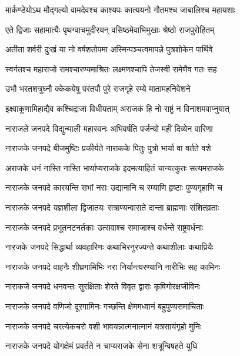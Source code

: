 \twolineshloka
{मार्कण्डेयोऽथ मौद्गल्यो वामदेवश्च काश्यपः}
{कात्ययनो गौतमश्च जाबालिश्च महायशाः} %

\twolineshloka
{एते द्विजाः सहामात्यैः पृथग्वाचमुदीरयन्}
{वसिष्ठमेवाभिमुखाः श्रेष्ठो राजपुरोहितम्} %

\twolineshloka
{अतीता शर्वरी दुःखं या नो वर्षशतोपमा}
{अस्मिन्पञ्चत्वमापन्ने पुत्रशोकेन पार्थिवे} %

\twolineshloka
{स्वर्गतश्च महाराजो रामश्चारण्यमाश्रितः}
{लक्ष्मणश्चापि तेजस्वी रामेणैव गतः सह} %

\twolineshloka
{उभौ भरतशत्रुघ्नौ क्केकयेषु परंतपौ}
{पुरे राजगृहे रम्ये मातामहनिवेशने} %

\twolineshloka
{इक्ष्वाकूणामिहाद्यैव कश्चिद्राजा विधीयताम्}
{अराजकं हि नो राष्ट्रं न विनाशमवाप्नुयात्} %

\twolineshloka
{नाराजले जनपदे विद्युन्माली महास्वनः}
{अभिवर्षति पर्जन्यो महीं दिव्येन वारिणा} %

\twolineshloka
{नाराजके जनपदे बीजमुष्टिः प्रकीर्यते}
{नाराकके पितुः पुत्रो भार्या वा वर्तते वशे} %

\twolineshloka
{अराजके धनं नास्ति नास्ति भार्याप्यराजके}
{इदमत्याहितं चान्यत्कुतः सत्यमराजके} %

\twolineshloka
{नाराजके जनपदे कारयन्ति सभां नराः}
{उद्यानानि च रम्याणि हृष्टाः पुण्यगृहाणि च} %

\twolineshloka
{नाराजके जनपदे यज्ञशीला द्विजातयः}
{सत्राण्यन्वासते दान्ता ब्राह्मणाः संशितव्रताः} %

\twolineshloka
{नाराजके जनपदे प्रभूतनटनर्तकाः}
{उत्सवाश्च समाजाश्च वर्धन्ते राष्ट्रवर्धनाः} %

\twolineshloka
{नारजके जनपदे सिद्धार्था व्यवहारिणः}
{कथाभिरनुरज्यन्ते कथाशीलाः कथाप्रियैः} %

\twolineshloka
{नाराजके जनपदे वाहनैः शीघ्रगामिभिः}
{नरा निर्यान्त्यरण्यानि नारीभिः सह कामिनः} %

\twolineshloka
{नाराकजे जनपदे धनवन्तः सुरक्षिताः}
{शेरते विवृत द्वाराः कृषिगोरक्षजीविनः} %

\twolineshloka
{नाराजके जनपदे वणिजो दूरगामिनः}
{गच्छन्ति क्षेममध्वानं बहुपुण्यसमाचिताः} %

\twolineshloka
{नाराजके जनपदे चरत्येकचरो वशी}
{भावयन्नात्मनात्मानं यत्रसायंगृहो मुनिः} %

\twolineshloka
{नाराजके जनपदे योगक्षेमं प्रवर्तते}
{न चाप्यराजके सेना शत्रून्विषहते युधि} %

